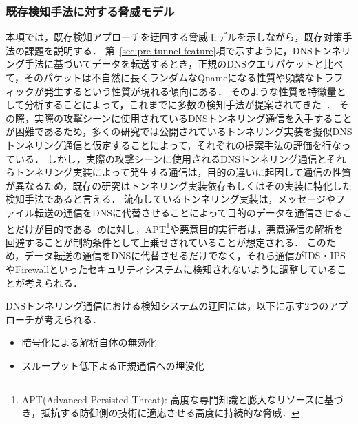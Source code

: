 \subsubsection{既存検知手法に対する脅威モデル}
\label{sec:bypass-method}
本項では，既存検知アプローチを迂回する脅威モデルを示しながら，既存対策手法の課題を説明する．
第~\ref{sec:pre-tunnel-feature}項で示すように，DNSトンネリング手法に基づいてデータを転送するとき，正規のDNSクエリパケットと比べて，そのパケットは不自然に長くランダムなQnameになる性質や頻繁なトラフィックが発生するという性質が現れる傾向にある．
そのような性質を特徴量として分析することによって，これまでに多数の検知手法が提案されてきた~\cite{born, cheng, liu, asaf, steadman, jawad}．
その際，実際の攻撃シーンに使用されているDNSトンネリング通信を入手することが困難であるため，多くの研究では公開されているトンネリング実装を擬似DNSトンネリング通信と仮定することによって，それぞれの提案手法の評価を行なっている．
しかし，実際の攻撃シーンに使用されるDNSトンネリング通信とそれらトンネリング実装によって発生する通信は，目的の違いに起因して通信の性質が異なるため，既存の研究はトンネリング実装依存もしくはその実装に特化した検知手法であると言える．
流布しているトンネリング実装は，メッセージやファイル転送の通信をDNSに代替させることによって目的のデータを通信させることだけが目的である~\cite{iodine}のに対し，APT\footnote{APT(Advanced Persisted Threat): 高度な専門知識と膨大なリソースに基づき，抵抗する防御側の技術に適応させる高度に持続的な脅威\cite{APT}．}や悪意目的実行者は，悪意通信の解析を回避することが制約条件として上乗せされていることが想定される．
このため，データ転送の通信をDNSに代替させるだけでなく，それら通信がIDS・IPSやFirewallといったセキュリティシステムに検知されないように調整していることが考えられる．

DNSトンネリング通信における検知システムの迂回には，以下に示す2つのアプローチが考えられる．
\vspace{-5pt}
\begin{itemize}
 \item 暗号化による解析自体の無効化
 \vspace{-5pt}
 \item スループット低下よる正規通信への埋没化
\end{itemize}

